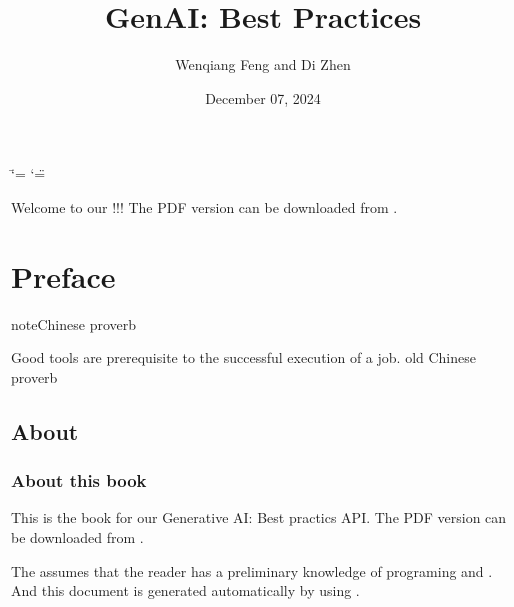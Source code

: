 \documentclass[letterpaper,11pt,english]{sphinxmanual}
\title{GenAI: Best Practices}
\date{December 07, 2024}
\author{Wenqiang Feng and Di Zhen}
\begin{document}
\ifdefined\shorthandoff
  \ifnum\catcode`\=\string=\active\shorthandoff{=}\fi
  \ifnum\catcode`\"=\active{}\fi
\fi

\pagestyle{empty}
\sphinxmaketitle
\pagestyle{plain}
\sphinxtableofcontents
\pagestyle{normal}
\label{\detokenize{index::doc}}\label{\detokenize{index:index}}\begin{quote}

\begin{figure}[htbp]
\centering

\noindent{}
\end{figure}
\end{quote}

\sphinxAtStartPar
Welcome to our !!! The PDF version
can be downloaded from .



\sphinxstepscope


\chapter{Preface}
\label{\detokenize{preface:id1}}\label{\detokenize{preface::doc}}
\begin{sphinxadmonition}{note}{Chinese proverb}

\sphinxAtStartPar
Good tools are prerequisite to the successful execution of a job. \textendash{} old Chinese proverb
\end{sphinxadmonition}


\section{About}
\label{\detokenize{preface:about}}

\subsection{About this book}
\label{\detokenize{preface:about-this-book}}
\sphinxAtStartPar
This is the book for our Generative AI: Best practics  API.
The PDF version can be downloaded from . 

\sphinxAtStartPar
The  assumes that the reader has a preliminary knowledge of  programing and . And this
document is generated automatically by using .
\end{document}
